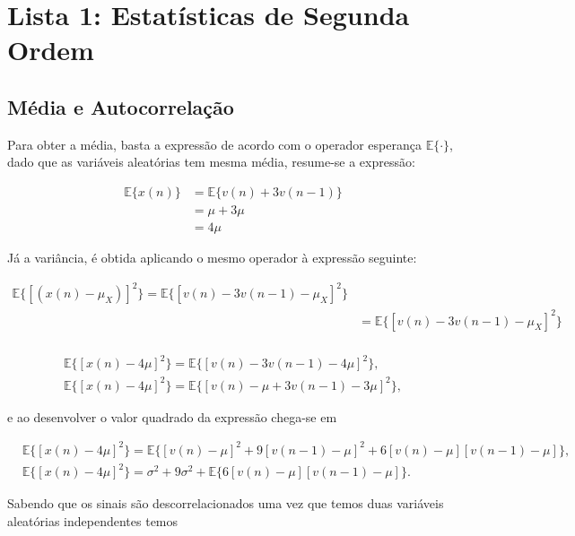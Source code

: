\section{Lista 1: Estatísticas de Segunda Ordem} %


\subsection{Média e Autocorrelação} %
Para obter a média, basta a expressão de acordo com o operador esperança $\mathbb{E}\{ \cdot \}$, dado que as variáveis aleatórias tem mesma média, resume-se a expressão:
				
\begin{align*}
    \mathbb{E}\{ x(n)\} &= \mathbb{E}\{ v(n) + 3v(n-1)\} \\
    &= \mu + 3\mu \\
    &= 4\mu
\end{align*}

Já a variância, é obtida aplicando o mesmo operador à expressão seguinte:

\begin{align*}
    \mathbb{E}\{[(x(n) - \mu_{X})]^2\} = \mathbb{E}\{[v(n) - 3v(n-1) - \mu_{X}]^{2}\} \\
    &= \mathbb{E}\{[v(n) - 3v(n-1) - \mu_{X}]^{2}\} \\
\end{align*}

\begin{align}
    \mathbb{E}\{[x(n) - 4\mu]^2\} = \mathbb{E}\{[v(n) - 3v(n-1) -4\mu]^{2}\}, \\
    \mathbb{E}\{[x(n) - 4\mu]^2\} = \mathbb{E}\{[v(n) - \mu + 3v(n-1) -3\mu]^{2}\},
\end{align}

e ao desenvolver o valor quadrado da expressão chega-se em

\begin{align}
    &\mathbb{E}\{[x(n) - 4\mu]^2\} = \mathbb{E}\{ [v(n) - \mu]^{2} + 9[v(n-1) - \mu]^{2} + 6[v(n) - \mu][v(n-1) - \mu] \}, \\
    &\mathbb{E}\{[x(n) - 4\mu]^2\} = \sigma^{2} + 9\sigma^{2} + \mathbb{E}\{6[v(n) - \mu][v(n-1) - \mu]\}.
\end{align}

Sabendo que os sinais são descorrelacionados uma vez que temos duas variáveis aleatórias independentes temos

